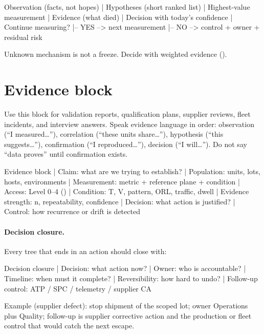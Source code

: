 \begin{dectree}
Observation (facts, not hopes)
  |
Hypotheses (short ranked list)
  |
Highest-value measurement
  |
Evidence (what died)
  |
Decision with today's confidence
  |
Continue measuring?
  |-- YES --> next measurement
  |-- NO  --> control + owner + residual risk
\end{dectree}

Unknown mechanism is not a freeze. Decide with weighted evidence
().

\section{Evidence block}
\label{sec:tree-evidence-block}

Use this block for validation reports, qualification plans, supplier reviews,
fleet incidents, and interview answers. Speak evidence language in order:
observation (``I measured\ldots''), correlation (``these units share\ldots''),
hypothesis (``this suggests\ldots''), confirmation (``I reproduced\ldots''),
decision (``I will\ldots''). Do not say ``data proves'' until confirmation
exists.

\begin{dectree}
Evidence block
  |
Claim: what are we trying to establish?
  |
Population: units, lots, hosts, environments
  |
Measurement: metric + reference plane + condition
  |
Access: Level 0--4 ()
  |
Condition: T, V, pattern, ORL, traffic, dwell
  |
Evidence strength: n, repeatability, confidence
  |
Decision: what action is justified?
  |
Control: how recurrence or drift is detected
\end{dectree}

\paragraph{Decision closure.}
\label{sec:tree-decision-closure}
Every tree that ends in an action should close with:

\begin{dectree}
Decision closure
  |
Decision: what action now?
  |
Owner: who is accountable?
  |
Timeline: when must it complete?
  |
Reversibility: how hard to undo?
  |
Follow-up control: ATP / SPC / telemetry / supplier CA
\end{dectree}

Example (supplier defect): stop shipment of the scoped lot; owner Operations
plus Quality; follow-up is supplier corrective action and the production or
fleet control that would catch the next escape.

